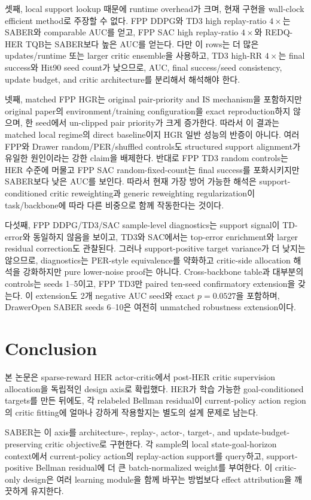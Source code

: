 \documentclass[letterpaper]{article}
\begin{document}
셋째, local support lookup 때문에 runtime overhead가 크며, 현재 구현을 wall-clock efficient method로 주장할 수 없다. FPP DDPG와 TD3 high replay-ratio \(4\times\)는 SABER와 comparable AUC를 얻고, FPP SAC high replay-ratio \(4\times\)와 REDQ-HER TQB는 SABER보다 높은 AUC를 얻는다. 다만 이 rows는 더 많은 updates/runtime 또는 larger critic ensemble을 사용하고, TD3 high-RR \(4\times\)는 final success와 Hit90 seed count가 낮으므로, AUC, final success/seed consistency, update budget, and critic architecture를 분리해서 해석해야 한다.

넷째, matched FPP HGR는 original pair-priority and IS mechanism을 포함하지만 original paper의 environment/training configuration을 exact reproduction하지 않으며, 한 seed에서 un-clipped pair priority가 크게 증가한다. 따라서 이 결과는 matched local regime의 direct baseline이지 HGR 일반 성능의 반증이 아니다. 여러 FPP와 Drawer random/PER/shuffled controls도 structured support alignment가 유일한 원인이라는 강한 claim을 배제한다. 반대로 FPP TD3 random controls는 HER 수준에 머물고 FPP SAC random-fixed-count는 final success를 포화시키지만 SABER보다 낮은 AUC를 보인다. 따라서 현재 가장 방어 가능한 해석은 support-conditioned critic reweighting과 generic reweighting regularization이 task/backbone에 따라 다른 비중으로 함께 작동한다는 것이다.

다섯째, FPP DDPG/TD3/SAC sample-level diagnostics는 support signal이 TD-error와 동일하지 않음을 보이고, TD3와 SAC에서는 top-error enrichment와 larger residual correction도 관찰된다. 그러나 support-positive target variance가 더 낮지는 않으므로, diagnostics는 PER-style equivalence를 약화하고 critic-side allocation 해석을 강화하지만 pure lower-noise proof는 아니다. Cross-backbone table과 대부분의 controls는 seeds 1--5이고, FPP TD3만 paired ten-seed confirmatory extension을 갖는다. 이 extension도 2개 negative AUC seed와 exact $p=0.0527$을 포함하며, DrawerOpen SABER seeds 6--10은 여전히 unmatched robustness extension이다.

\section{Conclusion}

본 논문은 sparse-reward HER actor-critic에서 post-HER critic supervision allocation을 독립적인 design axis로 확립했다. HER가 학습 가능한 goal-conditioned targets를 만든 뒤에도, 각 relabeled Bellman residual이 current-policy action region의 critic fitting에 얼마나 강하게 작용할지는 별도의 설계 문제로 남는다.

SABER는 이 axis를 architecture-, replay-, actor-, target-, and update-budget-preserving critic objective로 구현한다. 각 sample의 local state-goal-horizon context에서 current-policy action의 replay-action support를 query하고, support-positive Bellman residual에 더 큰 batch-normalized weight를 부여한다. 이 critic-only design은 여러 learning module을 함께 바꾸는 방법보다 effect attribution을 깨끗하게 유지한다.
\end{document}
